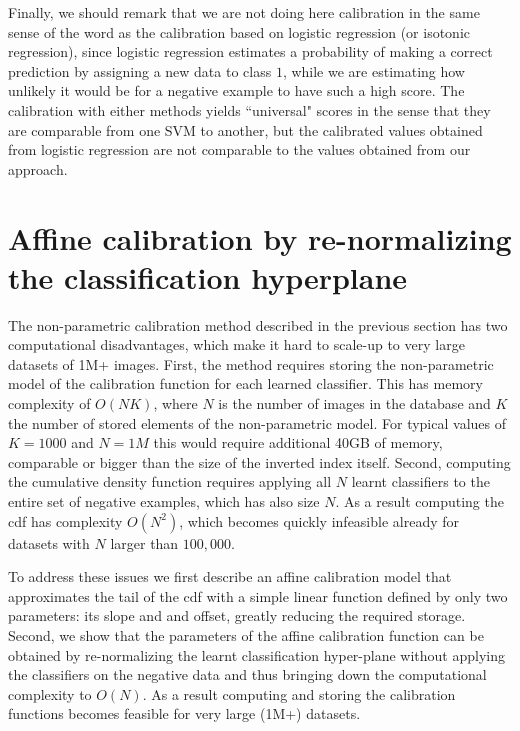       Finally, we should remark that we are not doing here calibration in the same sense of the word as the calibration based on logistic regression (or isotonic regression), since logistic regression estimates a probability of making a correct prediction by assigning a new data to class $1$, while we are estimating how unlikely it would be for a negative example to have such a high score. The calibration with either methods yields ``universal" scores in the sense that they are comparable from one SVM to another, but the calibrated values obtained from logistic regression are not comparable to the values obtained from our approach.

\section{Affine calibration by re-normalizing the classification hyperplane}
\label{sec:calibrationRenorm}
  
  The non-parametric calibration method described in the previous section has two computational disadvantages, which make it hard to scale-up to very large datasets of 1M+ images.  First, the method requires storing the non-parametric model of the calibration function for each learned classifier. This has memory complexity 
  of $O(NK)$, where $N$ is the number of images in the database and $K$ the number of stored elements of the non-parametric model. For typical values of $K=1000$
  and $N=1M$ this would require additional 40GB of memory, comparable or bigger than the size of the inverted index itself. Second, computing the cumulative density function requires applying all $N$ learnt classifiers to the entire set of negative examples, which has also size $N$. As a result computing the cdf has complexity $O(N^2)$, which becomes quickly infeasible already for datasets with $N$ larger than $100,000$. 
  
To address these issues we first describe an affine calibration model that approximates the tail of the cdf with a simple linear function defined by only two parameters: its slope and and offset, greatly reducing the required storage.
Second, we show that the parameters of the affine calibration function can be obtained by re-normalizing the learnt classification hyper-plane without applying the classifiers on the negative data and thus bringing down the computational complexity to $O(N)$.
As a result  computing and storing the calibration functions becomes feasible for very large (1M+) datasets.

